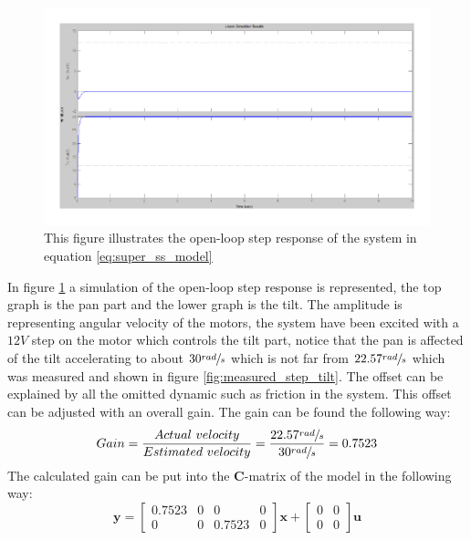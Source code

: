 \begin{figure}[htb]
	\begin{center}
	\includegraphics[scale=1,trim=0 0 0 0]{graphics/GoodSim.pdf} %
	\caption{This figure illustrates the open-loop step response of the system in equation \ref{eq:super_ss_model}}
	\label{fig:good_step}			%
	\end{center}
\end{figure}
In figure \ref{fig:good_step} a simulation of the open-loop step response is represented, the top graph is the pan part and the lower graph is the tilt. The amplitude is representing angular velocity of the motors, the system have been excited with a $12V$ step on the motor which controls the tilt part, notice that the pan is affected of the tilt accelerating to about $30\sfrac{rad}{s}$ which is not far from $22.57\sfrac{rad}{s}$ which was measured and shown in figure \ref{fig:measured_step_tilt}. The offset can be explained by all the omitted dynamic such as friction in the system. This offset can be adjusted with an overall gain. The gain can be found the following way:
\begin{equation}
	Gain = \frac{Actual\ velocity}{Estimated\ velocity} = \frac{22.57\sfrac{rad}{s}}{30\sfrac{rad}{s}} = 0.7523\label{eq:gain_constant}
\end{equation}
The calculated gain can be put into the \textbf{C}-matrix of the model in the following way:
\begin{equation}
 \textbf{y} =
 \begin{bmatrix}
   0.7523 & 0 & 0 & 0\\
   0 & 0 & 0.7523 & 0
 \end{bmatrix}
 \textbf{x} +
 \begin{bmatrix}
   0 & 0\\
   0 & 0
 \end{bmatrix}
 \textbf{u}\label{eq:output_ss_model}
\end{equation}
